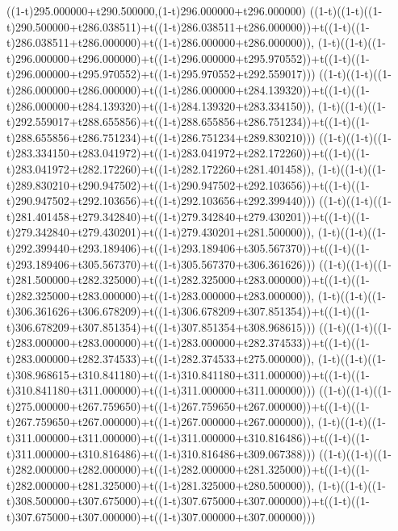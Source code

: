 ((1-t)295.000000+t290.500000,(1-t)296.000000+t296.000000)
((1-t)((1-t)((1-t)290.500000+t286.038511)+t((1-t)286.038511+t286.000000))+t((1-t)((1-t)286.038511+t286.000000)+t((1-t)286.000000+t286.000000)),                                     (1-t)((1-t)((1-t)296.000000+t296.000000)+t((1-t)296.000000+t295.970552))+t((1-t)((1-t)296.000000+t295.970552)+t((1-t)295.970552+t292.559017)))
((1-t)((1-t)((1-t)286.000000+t286.000000)+t((1-t)286.000000+t284.139320))+t((1-t)((1-t)286.000000+t284.139320)+t((1-t)284.139320+t283.334150)),                                     (1-t)((1-t)((1-t)292.559017+t288.655856)+t((1-t)288.655856+t286.751234))+t((1-t)((1-t)288.655856+t286.751234)+t((1-t)286.751234+t289.830210)))
((1-t)((1-t)((1-t)283.334150+t283.041972)+t((1-t)283.041972+t282.172260))+t((1-t)((1-t)283.041972+t282.172260)+t((1-t)282.172260+t281.401458)),                                     (1-t)((1-t)((1-t)289.830210+t290.947502)+t((1-t)290.947502+t292.103656))+t((1-t)((1-t)290.947502+t292.103656)+t((1-t)292.103656+t292.399440)))
((1-t)((1-t)((1-t)281.401458+t279.342840)+t((1-t)279.342840+t279.430201))+t((1-t)((1-t)279.342840+t279.430201)+t((1-t)279.430201+t281.500000)),                                     (1-t)((1-t)((1-t)292.399440+t293.189406)+t((1-t)293.189406+t305.567370))+t((1-t)((1-t)293.189406+t305.567370)+t((1-t)305.567370+t306.361626)))
((1-t)((1-t)((1-t)281.500000+t282.325000)+t((1-t)282.325000+t283.000000))+t((1-t)((1-t)282.325000+t283.000000)+t((1-t)283.000000+t283.000000)),                                     (1-t)((1-t)((1-t)306.361626+t306.678209)+t((1-t)306.678209+t307.851354))+t((1-t)((1-t)306.678209+t307.851354)+t((1-t)307.851354+t308.968615)))
((1-t)((1-t)((1-t)283.000000+t283.000000)+t((1-t)283.000000+t282.374533))+t((1-t)((1-t)283.000000+t282.374533)+t((1-t)282.374533+t275.000000)),                                     (1-t)((1-t)((1-t)308.968615+t310.841180)+t((1-t)310.841180+t311.000000))+t((1-t)((1-t)310.841180+t311.000000)+t((1-t)311.000000+t311.000000)))
((1-t)((1-t)((1-t)275.000000+t267.759650)+t((1-t)267.759650+t267.000000))+t((1-t)((1-t)267.759650+t267.000000)+t((1-t)267.000000+t267.000000)),                                     (1-t)((1-t)((1-t)311.000000+t311.000000)+t((1-t)311.000000+t310.816486))+t((1-t)((1-t)311.000000+t310.816486)+t((1-t)310.816486+t309.067388)))
((1-t)((1-t)((1-t)282.000000+t282.000000)+t((1-t)282.000000+t281.325000))+t((1-t)((1-t)282.000000+t281.325000)+t((1-t)281.325000+t280.500000)),                                     (1-t)((1-t)((1-t)308.500000+t307.675000)+t((1-t)307.675000+t307.000000))+t((1-t)((1-t)307.675000+t307.000000)+t((1-t)307.000000+t307.000000)))
